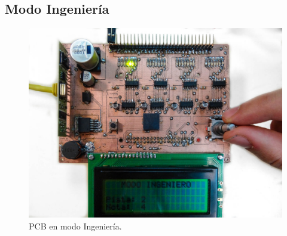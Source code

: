 \smallskip

\subsection{Modo Ingeniería}

\smallskip

\begin{figure}[H]
	\noindent \begin{centering}
		\includegraphics[width=\linewidth*2/3]{capitulo6/pcb_ingeniero}
		\par\end{centering}
	\smallskip
	\caption{\label{fig:pcb_ingeniero} PCB en modo Ingeniería.}
\end{figure} 

\smallskip

\clearpage{\cleardoublepage}
\clearpage{\pagestyle{empty}\cleardoublepage}

